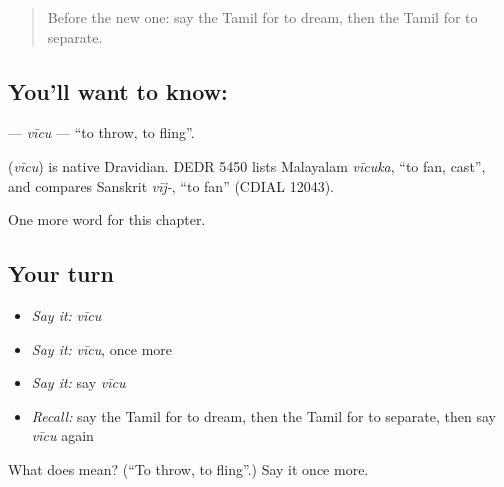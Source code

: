 \label{lesson:TA-C229-vicu}



\begin{quote}
Before the new one: say the Tamil for to dream, then the Tamil for to separate.
\end{quote}

\subsection*{You'll want to know: }
\textbf{} — \emph{vīcu} — \textquotedblleft{}to throw, to fling\textquotedblright{}.

\begin{cousinweb}
\textbf{} (\emph{vīcu}) is native Dravidian. DEDR 5450 lists Malayalam \emph{vīcuka}, \textquotedblleft{}to fan, cast\textquotedblright{}, and compares Sanskrit \emph{vīj-}, \textquotedblleft{}to fan\textquotedblright{} (CDIAL 12043).
\end{cousinweb}

\begin{grammarlens}[title={What you've built}]
One more word for this chapter.
\end{grammarlens}

\subsection*{Your turn}
\begin{itemize}
\raggedright
  \item \emph{Say it:} \emph{vīcu}
  \item \emph{Say it:} \emph{vīcu}, once more
  \item \emph{Say it:} say \emph{vīcu}
  \item \emph{Recall:} say the Tamil for to dream, then the Tamil for to separate, then say \emph{vīcu} again
\end{itemize}

\begin{tcolorbox}[breakable,colback=teal!4,colframe=teal!35!black,title={Before you move on}]
What does  mean? (\textquotedblleft{}To throw, to fling\textquotedblright{}.) Say it once more.
\end{tcolorbox}
